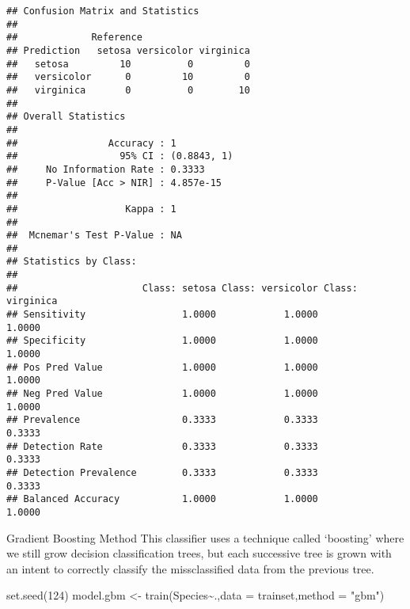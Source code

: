 \documentclass[
]{article}
\newenvironment{Shaded}{\begin{snugshade}}{\end{snugshade}}
\newcommand{\AttributeTok}[1]{\textcolor[rgb]{0.77,0.63,0.00}{#1}}
\newcommand{\DecValTok}[1]{\textcolor[rgb]{0.00,0.00,0.81}{#1}}
\newcommand{\FunctionTok}[1]{\textcolor[rgb]{0.00,0.00,0.00}{#1}}
\newcommand{\NormalTok}[1]{#1}
\newcommand{\OtherTok}[1]{\textcolor[rgb]{0.56,0.35,0.01}{#1}}
\newcommand{\SpecialCharTok}[1]{\textcolor[rgb]{0.00,0.00,0.00}{#1}}
\newcommand{\StringTok}[1]{\textcolor[rgb]{0.31,0.60,0.02}{#1}}
\begin{document}
\begin{verbatim}
## Confusion Matrix and Statistics
## 
##             Reference
## Prediction   setosa versicolor virginica
##   setosa         10          0         0
##   versicolor      0         10         0
##   virginica       0          0        10
## 
## Overall Statistics
##                                      
##                Accuracy : 1          
##                  95% CI : (0.8843, 1)
##     No Information Rate : 0.3333     
##     P-Value [Acc > NIR] : 4.857e-15  
##                                      
##                   Kappa : 1          
##                                      
##  Mcnemar's Test P-Value : NA         
## 
## Statistics by Class:
## 
##                      Class: setosa Class: versicolor Class: virginica
## Sensitivity                 1.0000            1.0000           1.0000
## Specificity                 1.0000            1.0000           1.0000
## Pos Pred Value              1.0000            1.0000           1.0000
## Neg Pred Value              1.0000            1.0000           1.0000
## Prevalence                  0.3333            0.3333           0.3333
## Detection Rate              0.3333            0.3333           0.3333
## Detection Prevalence        0.3333            0.3333           0.3333
## Balanced Accuracy           1.0000            1.0000           1.0000
\end{verbatim}

Gradient Boosting Method This classifier uses a technique called
`boosting' where we still grow decision classification trees, but each
successive tree is grown with an intent to correctly classify the
missclassified data from the previous tree.

\begin{Shaded}
\begin{Highlighting}[]
\FunctionTok{set.seed}\NormalTok{(}\DecValTok{124}\NormalTok{)}
\NormalTok{model.gbm }\OtherTok{\textless{}{-}} \FunctionTok{train}\NormalTok{(Species}\SpecialCharTok{\textasciitilde{}}\NormalTok{.,}\AttributeTok{data =}\NormalTok{ trainset,}\AttributeTok{method =} \StringTok{"gbm"}\NormalTok{)}
\end{Highlighting}
\end{Shaded}
\end{document}
